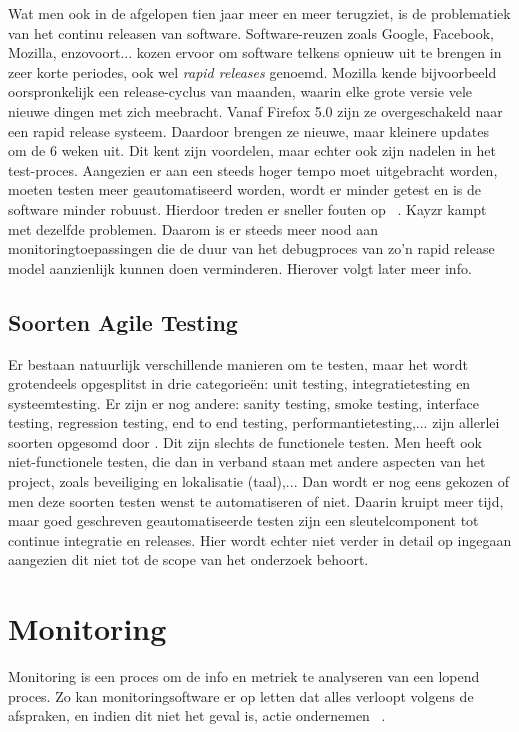 Wat men ook in de afgelopen tien jaar meer en meer terugziet, is de problematiek van het continu releasen van software. Software-reuzen zoals Google, Facebook, Mozilla, enzovoort... kozen ervoor om software telkens opnieuw uit te brengen in zeer korte periodes, ook wel \textit{rapid releases} genoemd. Mozilla kende bijvoorbeeld oorspronkelijk een release-cyclus van maanden, waarin elke grote versie vele nieuwe dingen met zich meebracht. Vanaf Firefox 5.0 zijn ze overgeschakeld naar een rapid release systeem. Daardoor brengen ze nieuwe, maar kleinere updates om de 6 weken uit. Dit kent zijn voordelen, maar echter ook zijn nadelen in het test-proces. Aangezien er aan een steeds hoger tempo moet uitgebracht worden, moeten testen meer geautomatiseerd worden, wordt er minder getest en is de software minder robuust. Hierdoor treden er sneller fouten op ~\autocite{Maentylae2013}. Kayzr kampt met dezelfde problemen. Daarom is er steeds meer nood aan monitoringtoepassingen die de duur van het debugproces van zo'n rapid release model aanzienlijk kunnen doen verminderen. Hierover volgt later meer info. 

\subsection{Soorten Agile Testing}
\label{sec:kindsOfTesting}

Er bestaan natuurlijk verschillende manieren om te testen, maar het wordt grotendeels opgesplitst in drie categorieën: unit testing, integratietesting en systeemtesting. Er zijn er nog andere: sanity testing, smoke testing, interface testing, regression testing, end to end testing, performantietesting,... zijn allerlei soorten opgesomd door \textcite{Pittet}. Dit zijn slechts de functionele testen. Men heeft ook niet-functionele testen, die dan in verband staan met andere aspecten van het project, zoals beveiliging en lokalisatie (taal),... Dan wordt er nog eens gekozen of men deze soorten testen wenst te automatiseren of niet. Daarin kruipt meer tijd, maar goed geschreven geautomatiseerde testen zijn een sleutelcomponent tot continue integratie en releases. Hier wordt echter niet verder in detail op ingegaan aangezien dit niet tot de scope van het onderzoek behoort.

\section{Monitoring}
\label{sec:monitoring}

Monitoring is een proces om de info en metriek te analyseren van een lopend proces. Zo kan monitoringsoftware er op letten dat alles verloopt volgens de afspraken, en indien dit niet het geval is, actie ondernemen ~\autocite{Rouse2018}. 

